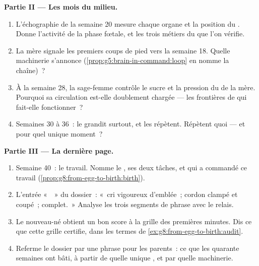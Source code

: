\begin{problem}
\medskip\noindent\textbf{Partie II --- Les mois du milieu.}
\begin{enumerate}[resume]
  \item L'échographie de la semaine 20 mesure chaque organe et la
        position du . Donne l'activité de la phase fœtale,
        et les trois métiers du  que l'on vérifie.
  \item La mère signale les premiers coups de pied vers la semaine
        18. Quelle machinerie s'annonce
        (\cref{prop:g5:brain-in-command:loop} en nomme la chaîne)~?
  \item À la semaine 28, la sage-femme contrôle le sucre et la
        pression du  de la mère. Pourquoi sa circulation
        est-elle doublement chargée --- les frontières de qui
        fait-elle fonctionner~?
  \item Semaines 30 à 36~: le  grandit surtout, et les 
        répètent. Répètent quoi --- et pour quel unique moment~?
\end{enumerate}

\medskip\noindent\textbf{Partie III --- La dernière page.}
\begin{enumerate}[resume]
  \item Semaine 40~: le travail. Nomme le , ses deux tâches,
        et qui a commandé ce travail
        (\cref{prop:g8:from-egg-to-birth:birth}).
  \item L'entrée «~~» du dossier~: «~cri vigoureux
        d'emblée~; cordon clampé et coupé~;  complet.~»
        Analyse les trois segments de phrase avec le relais.
  \item Le nouveau-né obtient un bon score à la grille des
        premières minutes. Dis ce que cette grille certifie, dans
        les termes de \cref{ex:g8:from-egg-to-birth:audit}.
  \item Referme le dossier par une phrase pour les parents~: ce que
        les quarante semaines ont bâti, à partir de quelle unique
        , et par quelle machinerie.
\end{enumerate}
\end{problem}
